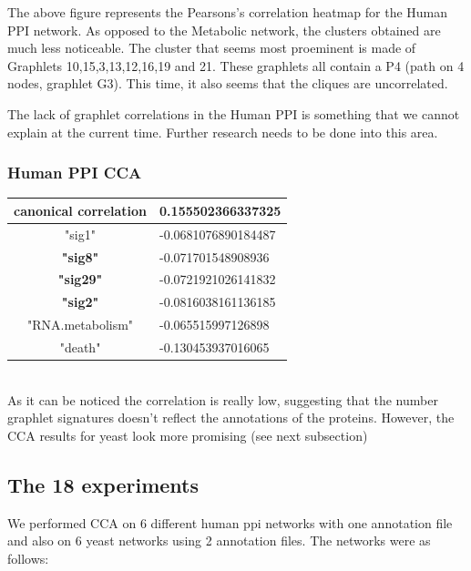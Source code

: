 \documentclass[11pt,a4paper,oneside]{report}
\begin{document}
The above figure represents the Pearsons's correlation heatmap for the Human PPI 
network. As opposed to the Metabolic network, the clusters obtained are much less 
noticeable. The cluster that seems most proeminent is made of Graphlets 10,15,3,13,12,16,19 and 21.
These graphlets all contain a P4 (path on 4 nodes, graphlet G3). 
This time, it also seems that the cliques are uncorrelated.

The lack of graphlet correlations in the Human PPI is something that we cannot 
explain at the current time. Further research needs to be done into this area. 


\subsubsection{Human PPI CCA}

\begin{tabular}{ c | l }
canonical correlation &  0.155502366337325\\
\hline
"sig1" & -0.0681076890184487\\
\textbf{"sig8"} & -0.071701548908936\\
\textbf{"sig29"} & -0.0721921026141832\\
\textbf{"sig2"} & -0.0816038161136185\\
\hline
"RNA.metabolism" & -0.065515997126898\\
"death" & -0.130453937016065\\
\end{tabular}\\



As it can be noticed the correlation is really low, suggesting that the number graphlet signatures doesn't reflect the annotations of the proteins. However, the CCA results for yeast look more promising (see next subsection)

\subsection*{The 18 experiments}

We performed CCA on 6 different human ppi networks with one annotation file and also on 6 yeast networks using 2 annotation files. The networks were as follows:
\end{document}
